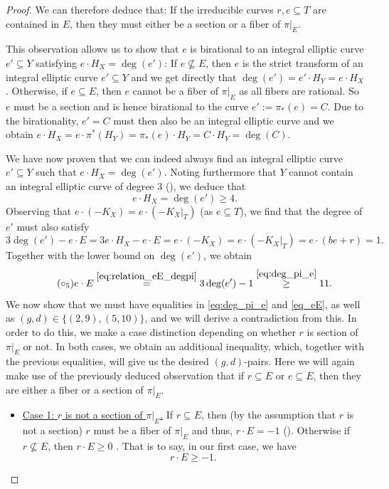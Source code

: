 \documentclass[english,11pt,reqno]{amsart}
\newcommand{\sub}{\subseteq}
\begin{document}
\begin{proof}
We can therefore deduce that: If the irreducible curves $r,e\sub T$ are contained in $E$, then they must either be a section or a fiber of $\pi|_E$. \par 
This observation allows us to show that $e$ is birational to an integral elliptic curve $e'\sub Y$ satisfying $e\cdot H_X = \deg(e')$: If $e\not \sub E$, then $e$ is the strict transform of an integral elliptic curve $e'\sub Y$ and we get directly that $\deg(e')=e'\cdot H_Y=e\cdot H_X$. Otherwise, if $e\sub E$, then $e$ cannot be a fiber of $\pi|_E$ as all fibers are rational. So $e$ must be a section and is hence birational to the curve $e':=\pi_*(e)=C$. Due to the birationality, $e'=C$ must then also be an integral elliptic curve and we obtain $e\cdot H_X=e\cdot \pi^*(H_Y)=\pi_*(e)\cdot H_Y=C\cdot H_Y=\deg(C)$. \par
We have now proven that we can indeed always find an integral elliptic curve $e'\sub Y$ such that $e\cdot H_X =\deg(e')$. Noting furthermore that $Y$ cannot contain an integral elliptic curve of degree 3 (), we deduce that 
\begin{equation} \label{eq:deg_pi_e} \tag{$\circ_3$}
e\cdot H_X=\deg(e')\geq 4.
\end{equation}
Observing that $e\cdot (-K_X)=e\cdot (-K_X|_T)$ (as $e\sub T$), we find that the degree of $e'$ must also satisfy
\begin{equation*} \tag{$\circ_4$} \label{eq:relation_eE_degpi}
3\deg(e')-e\cdot E=3 e \cdot H_X - e\cdot E= e\cdot (-K_X)=e\cdot (-K_X|_T)= e \cdot (be+r) = 1.
\end{equation*}
Together with the lower bound on $\deg(e')$, we obtain
\begin{equation} \label{eq_eE} \tag{$\circ_5$} 
e\cdot E \overset{\eqref{eq:relation_eE_degpi}}{=}3\deg(e') -1 \overset{\eqref{eq:deg_pi_e}}{\geq} 11. 
\end{equation}
We now show that we must have equalities in \eqref{eq:deg_pi_e} and \eqref{eq_eE}, as well as $(g,d)\in\{(2,9),(5,10)\}$, and we will derive a contradiction from this. In order to do this, we make a case distinction depending on whether $r$ is section of $\pi|_E$ or not. In both cases, we obtain an additional inequality, which, together with the previous equalities, will give us the desired $(g,d)$-pairs. Here we will again make use of the previously deduced observation that if $r\sub E$ or $e\sub E$, then they are either a fiber or a section of $\pi|_E$.
\begin{itemize}
\item \underline{Case 1: $r$ is not a section of $\pi|_E$.} If $r\sub E$, then (by the assumption that $r$ is not a section) $r$ must be a fiber of $\pi|_E$ and thus, $r\cdot E=-1$ (\cite[Lemma 2.2.14]{Shafarevich_Parshin_AlgGeom_Fano_varieties}). Otherwise if $r\not \sub E$, then $r\cdot E\geq 0$ . That is to say, in our first case, we have
\begin{equation} \label{eq:case_1} \tag{$\bullet_1$}
	r\cdot E \geq -1.
\end{equation} 


\end{itemize}
\end{proof}
\end{document}
